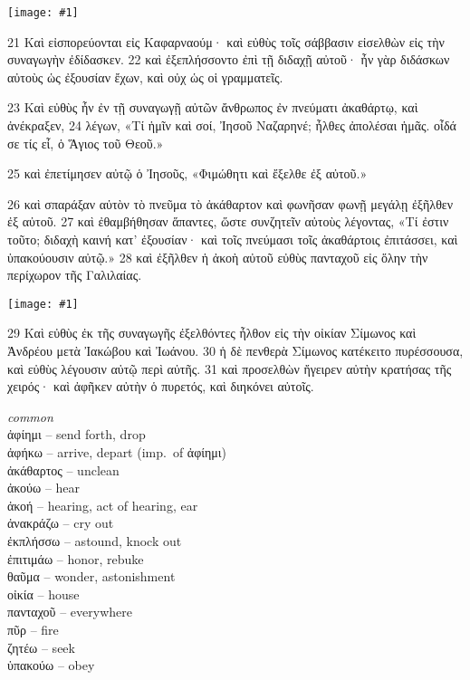 \documentclass[10pt,a5paper,twoside,twocolumn]{book}
\newcommand{\fig}[1]{\texttt{[image: \#1]}\label{fig:#1}}
\newcommand*\cleartoleftpage{%
  \ifodd\value{page}\hbox{}\clearpage\fi
}
\newenvironment{facing}{\cleartoleftpage}{\clearpage\pagebreak}
\newenvironment{help}{\clearpage}{}
\newenvironment{helpsec}{\begin{minipage}[t]{\textwidth}\begin{multicols}{2}}{\end{multicols}\end{minipage}}
\newenvironment{vocab}{\begin{helpsec}}{\end{helpsec}}
\begin{document}
\begin{facing}

\fig{01-21} %

21 Καὶ εἰσπορεύονται εἰς Καφαρναούμ· καὶ εὐθὺς τοῖς σάββασιν εἰσελθὼν εἰς τὴν συναγωγὴν ἐδίδασκεν. 22 καὶ ἐξεπλήσσοντο ἐπὶ τῇ διδαχῇ αὐτοῦ· ἦν γὰρ διδάσκων αὐτοὺς ὡς ἐξουσίαν ἔχων, καὶ οὐχ ὡς οἱ γραμματεῖς.

23 Καὶ εὐθὺς ἦν ἐν τῇ συναγωγῇ αὐτῶν ἄνθρωπος ἐν πνεύματι ἀκαθάρτῳ, καὶ ἀνέκραξεν, 
24 λέγων, «Τί ἡμῖν καὶ σοί, Ἰησοῦ Ναζαρηνέ; ἦλθες ἀπολέσαι ἡμᾶς. οἶδά σε τίς εἶ, ὁ Ἅγιος τοῦ Θεοῦ.»

25 καὶ ἐπετίμησεν αὐτῷ ὁ Ἰησοῦς, «Φιμώθητι καὶ ἔξελθε ἐξ αὐτοῦ.»

26 καὶ σπαράξαν αὐτὸν τὸ πνεῦμα τὸ ἀκάθαρτον καὶ φωνῆσαν φωνῇ μεγάλῃ ἐξῆλθεν ἐξ αὐτοῦ.
27 καὶ ἐθαμβήθησαν ἅπαντες, ὥστε συνζητεῖν αὐτοὺς λέγοντας, «Τί ἐστιν τοῦτο; διδαχὴ καινή κατ’ ἐξουσίαν· καὶ τοῖς πνεύμασι τοῖς ἀκαθάρτοις ἐπιτάσσει, 
καὶ ὑπακούουσιν αὐτῷ.»
28 καὶ ἐξῆλθεν ἡ ἀκοὴ αὐτοῦ εὐθὺς πανταχοῦ εἰς ὅλην τὴν περίχωρον τῆς Γαλιλαίας.

\fig{01-29} %

29 Καὶ εὐθὺς ἐκ τῆς συναγωγῆς ἐξελθόντες ἦλθον εἰς τὴν οἰκίαν Σίμωνος καὶ Ἀνδρέου μετὰ Ἰακώβου καὶ Ἰωάνου. 30 ἡ δὲ πενθερὰ Σίμωνος κατέκειτο πυρέσσουσα, καὶ εὐθὺς λέγουσιν αὐτῷ περὶ αὐτῆς. 31 καὶ προσελθὼν ἤγειρεν αὐτὴν κρατήσας τῆς χειρός· καὶ ἀφῆκεν αὐτὴν ὁ πυρετός, καὶ διηκόνει αὐτοῖς. 

\begin{help}
\begin{vocab}
\emph{common}\\
ἀφίημι -- send forth, drop\\
ἀφήκω -- arrive, depart (imp.~of ἀφίημι)\\
ἀκάθαρτος -- unclean\\
ἀκούω -- hear\\
ἀκοή -- hearing, act of hearing, ear\\
ἀνακράζω -- cry out \\
ἐκπλήσσω -- astound, knock out\\
ἐπιτιμάω -- honor, rebuke\\
θαῦμα -- wonder, astonishment\\
οἰκία -- house\\
πανταχοῦ -- everywhere\\
πῦρ -- fire\\
ζητέω -- seek \\
ὑπακούω -- obey\\


\end{vocab}
\end{help}
\end{facing}
\end{document}
